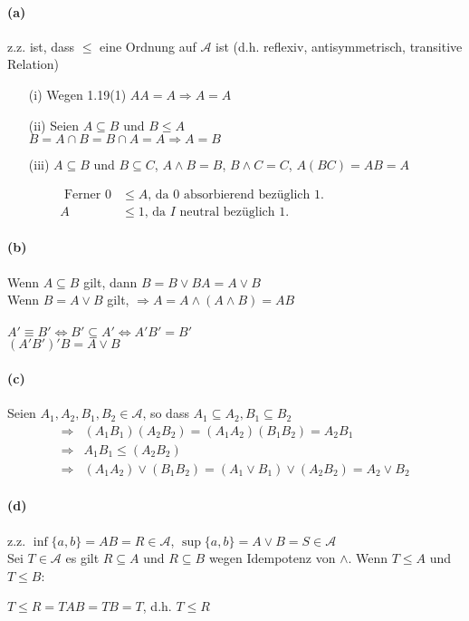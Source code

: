 \documentclass[10pt, a4paper]{article}
\begin{document}
\paragraph*{(a)}
z.z. ist, dass $\leq$ eine Ordnung auf $\mathcal{A}$ ist (d.h. reflexiv, antisymmetrisch, transitive Relation)
\begin{itemize}
	\item[(i)] Wegen 1.19(1) $AA=A\Rightarrow A=A$
	\item[(ii)] Seien $A\subseteq B$ und $B \leq A$	\\
	$B=A\cap B=B\cap A=A\Rightarrow A=B$
	\item[(iii)] $A\subseteq B$ und $B\subseteq C$, $A\wedge B=B$, $B\wedge C=C$, $A(BC)=AB=A$
\end{itemize}
\begin{align*}
	\text{ Ferner }0&\leq A\text{, da }0\text{  absorbierend bezüglich  }1.~~~~~~~~~~~~~~~~~~~~~~~~~~~~~~~	\\
	A&\leq 1\text{, da }I\text{ neutral bezüglich }1.
\end{align*}


\paragraph*{(b)}
Wenn $A\subseteq B$ gilt, dann $B=B\vee BA=A\vee B$	\\
Wenn $B=A\vee B$ gilt, $\Rightarrow A=A\wedge(A\wedge B)=AB$	\\
\\
$A'\equiv B'\Leftrightarrow B'\subseteq A'\Leftrightarrow A'B'=B'$	\\
$(A'B')'B=A\vee B$

\paragraph*{(c)}Seien $A_{1},A_{2},B_{1},B_{2}\in\mathcal{A}$, so dass $A_{1}\subseteq A_{2},B_{1}\subseteq B_{2}$
\begin{align*}
	\Rightarrow& (A_{1}B_{1})(A_{2}B_{2})=(A_{1}A_{2})(B_{1}B_{2})=A_{2}B_{1}	\\
	\Rightarrow& A_{1}B_{1}\leq(A_{2}B_{2})	\\
	\Rightarrow& (A_{1}A_{2})\vee(B_{1}B_{2})=(A_{1}\vee B_{1})\vee(A_{2}B_{2})=A_{2}\vee B_{2}
\end{align*}


\paragraph*{(d)}z.z. $\inf\{a,b\}=AB=R\in\mathcal{A}$, $\sup\{a,b\}=A\vee B=S\in\mathcal{A}$	\\
Sei $T\in\mathcal{A}$ es gilt $R\subseteq A$ und $R\subseteq B$ wegen Idempotenz von $\wedge$. Wenn $T\leq A$ und $T\leq B$:	\\
\begin{center}
$T\leq R= TAB=TB=T$, d.h. $T\leq R$
\end{center}
\end{document}

